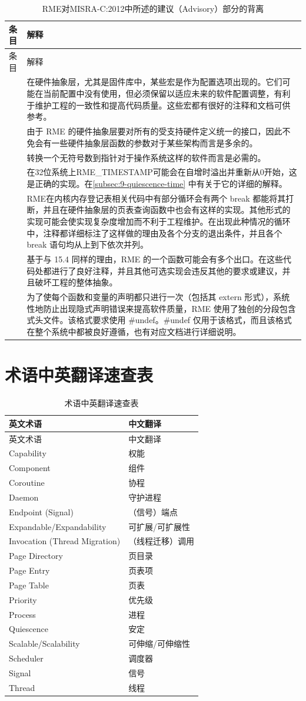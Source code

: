 \begin{xltabular}{\textwidth}{@{}>{\hsize\raggedright\arraybackslash}X>{\hsize\raggedright\arraybackslash}X@{}}
\caption{RME对MISRA-C:2012中所述的建议（Advisory）部分的背离}\label{tab:9-7-misra-advisory-deviations}\\
\toprule
条目 & 解释\tabularnewline
\endfirsthead
\toprule
条目 & 解释\tabularnewline
\midrule
\endhead
\bottomrule
{} &
在硬件抽象层，尤其是固件库中，某些宏是作为配置选项出现的。它们可能在当前配置中没有使用，但必须保留以适应未来的软件配置调整，有利于维护工程的一致性和提高代码质量。这些宏都有很好的注释和文档可供参考。 &
由于 RME 的硬件抽象层要对所有的受支持硬件定义统一的接口，因此不免会有一些硬件抽象层函数的参数对于某些架构而言是多余的。 &
转换一个无符号数到指针对于操作系统这样的软件而言是必需的。 &
在32位系统上RME\_TIMESTAMP可能会在自增时溢出并重新从0开始，这是正确的实现。在\ref{subsec:9-quiescence-time}
中有关于它的详细的解释。 &
RME在内核内存登记表相关代码中有部分循环会有两个 break 都能将其打断，并且在硬件抽象层的页表查询函数中也会有这样的实现。其他形式的实现可能会使实现复杂度增加而不利于工程维护。在出现此种情况的循环中，注释都详细标注了这样做的理由及各个分支的退出条件，并且各个 break 语句均从上到下依次并列。 &
基于与 15.4 同样的理由，RME 的一个函数可能会有多个出口。在这些代码处都进行了良好注释，并且其他可选实现会违反其他的要求或建议，并且破坏工程的整体抽象。 &
为了使每个函数和变量的声明都只进行一次（包括其 extern 形式），系统性地防止出现隐式声明错误来提高软件质量，RME 使用了独创的分段包含式头文件。该格式要求使用 \#undef。\#undef 仅用于该格式，而且该格式在整个系统中都被良好遵循，也有对应文档进行详细说明。\tabularnewline
\end{xltabular}

\section{术语中英翻译速查表}\label{sec:9-terminology-translation-table}

\begin{xltabular}{\textwidth}{@{}>{\hsize\raggedright\arraybackslash}X>{\hsize\raggedright\arraybackslash}X@{}}
\caption{术语中英翻译速查表}\label{tab:9-8-terminology-translation}\\
\toprule
英文术语 & 中文翻译\tabularnewline
\endfirsthead
\toprule
英文术语 & 中文翻译\tabularnewline
\midrule
\endhead
\bottomrule
\endlastfoot
Capability & 权能\tabularnewline
Component & 组件\tabularnewline
Coroutine & 协程\tabularnewline
Daemon & 守护进程\tabularnewline
Endpoint (Signal) & （信号）端点\tabularnewline
Expandable/Expandability & 可扩展/可扩展性\tabularnewline
Invocation (Thread Migration) & （线程迁移）调用\tabularnewline
Page Directory & 页目录\tabularnewline
Page Entry & 页表项\tabularnewline
Page Table & 页表\tabularnewline
Priority & 优先级\tabularnewline
Process & 进程\tabularnewline
Quiescence & 安定\tabularnewline
Scalable/Scalability & 可伸缩/可伸缩性\tabularnewline
Scheduler & 调度器\tabularnewline
Signal & 信号\tabularnewline
Thread & 线程\tabularnewline
\end{xltabular}

